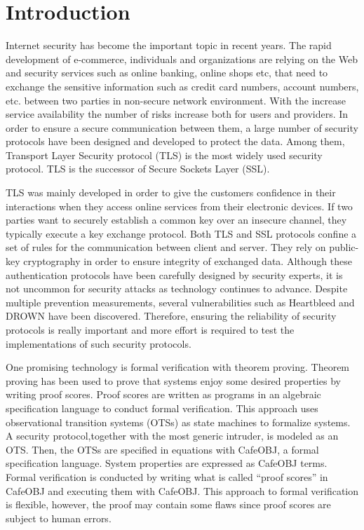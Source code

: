 \documentclass[a4paper,fleqn]{cas-dc}
\begin{document}
\section{Introduction}\label{intro}
Internet security has become the important topic in recent years. The rapid development of e-commerce, individuals and organizations are relying on the Web and security services such as online banking, online shops etc, that need to exchange the sensitive information such as credit card numbers, account numbers, etc. between two parties in non-secure network environment. With the increase service availability the number of risks increase both for users and providers. In order to ensure a secure communication between them, a large number of security protocols have been designed and developed to protect the data. Among them, Transport Layer Security protocol (TLS)\cite{dierk} is the most widely used security protocol. TLS is the successor of Secure Sockets Layer (SSL)\cite{1621007}. 

TLS was mainly developed in order to give the customers
confidence in their interactions when they access online services
from their electronic devices. If two parties want to securely establish a common key over an insecure channel, they typically execute a key exchange protocol. Both TLS and SSL protocols confine a set of rules for the communication between client and server. They rely on public-key cryptography in order to ensure integrity of exchanged data. Although  these  authentication  protocols  have been carefully designed by security experts, it is not uncommon for security attacks  as  technology  continues  to  advance. Despite multiple prevention measurements, several vulnerabilities such as  
Heartbleed\cite{10.1145/2663716.2663755} and DROWN\cite{197245} have been discovered. Therefore, ensuring the reliability of security protocols is really important and more effort is required to test the implementations of such security protocols.

One promising technology is formal verification  with theorem  proving. Theorem proving has been used to prove that systems enjoy some desired properties by writing proof scores. Proof scores are written as programs in an algebraic specification language to conduct formal verification. This approach uses observational transition systems (OTSs) \cite{OgataF03fmoods} as state machines to formalize systems. A security protocol,together with the most generic intruder, is modeled as an OTS. Then, the OTSs are specified in equations with CafeOBJ\cite{DiaconescuF98amast}, a formal specification language. System properties are expressed as CafeOBJ terms. Formal verification is conducted by writing what is called ``proof scores'' \cite{OgataF03fmoods} in CafeOBJ and executing them with CafeOBJ. This approach to formal verification is flexible, however, the proof may contain some flaws since proof scores are subject to human errors. 
\end{document}

